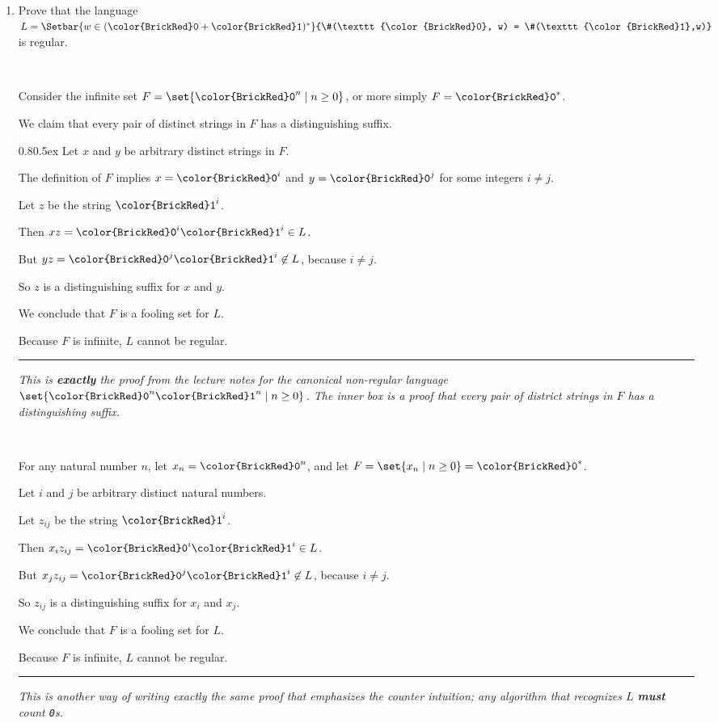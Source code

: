 \documentclass[11pt]{article}
\def\Sym#1{\texttt{\color{BrickRed}#1}}
\begin{document}
\begin{enumerate}\itemsep 4ex
\setcounter{enumi}{8}

\item
Prove that the language $L = \Setbar{w\in(\Sym0+\Sym1)^*}{\#(\Sym0, w) = \#(\Sym1,w)}$ is  regular.

\begin{Solution}[fooling set $\Sym0^*$]\parindent 0pt~

Consider the infinite set $F  = \set{\Sym0^n \mid n\ge 0}$, or more simply $F = \Sym0^*$.

We claim that every pair of distinct strings in $F$ has a distinguishing suffix.

\begin{shadowbox}{0.8}\parskip0.5ex
Let $x$ and $y$ be arbitrary distinct strings in $F$.

The definition of $F$ implies $x = \Sym0^i$ and $y=\Sym0^j$ for some integers $i\ne j$.

Let $z$ be the string $\Sym1^i$.

Then $xz = \Sym0^i\Sym1^i \in L$.

But $yz = \Sym0^j\Sym1^i \not\in L$, because $i\ne j$.

So $z$ is a distinguishing suffix for $x$ and $y$.
\end{shadowbox}

We conclude that $F$ is a fooling set for $L$.

Because $F$ is infinite, $L$ cannot be regular.\EOS

\medskip
\hrule
\smallskip
\emph{This is \textbf{exactly} the proof from the lecture notes for the canonical non-regular language $\set{\Sym0^n\Sym1^n \mid n\ge 0}$.  The inner box is a proof that every pair of district strings in $F$ has a distinguishing suffix.}
\end{Solution}
\unskip

\begin{Solution}[fooling set $\Sym0^*$]\parindent 0pt~

For any natural number $n$, let $x_n = \Sym0^n$, and let $F = \set{x_n \mid n\ge 0} = \Sym0^*$.

Let $i$ and $j$ be arbitrary distinct natural numbers.

Let $z_{ij}$ be the string $\Sym1^i$.

Then $x_iz_{ij} = \Sym0^i\Sym1^i \in L$.

But $x_jz_{ij} = \Sym0^j\Sym1^i \not\in L$, because $i\ne j$.

So $z_{ij}$ is a distinguishing suffix for $x_i$ and $x_j$.

We conclude that $F$ is a fooling set for $L$.

Because $F$ is infinite, $L$ cannot be regular.
\EOS

\medskip
\hrule
\smallskip
\emph{This is another way of writing exactly the same proof that emphasizes the counter intuition; any algorithm that recognizes $L$ \textbf{must} count \Sym0s.}
\end{Solution}
\unskip

\end{enumerate}
\end{document}
